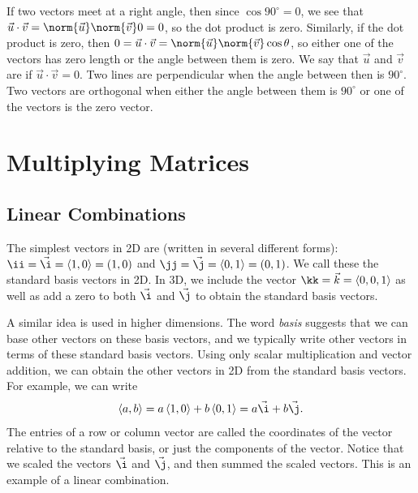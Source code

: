 If two vectors meet at a right angle, then since $\cos 90^\circ = 0$, we see that $\vec u \cdot \vec v = \norm{\vec u}\norm{\vec v}0=0$, so the dot product is zero. 
Similarly, if the dot product is zero, then $0=\vec u \cdot \vec v = \norm{\vec u}\norm{\vec v}\cos \theta$, so either one of the vectors has zero length or the angle between them is zero. 
We say that $\vec u$ and $\vec v$ are  if $\vec u \cdot \vec v=0$. 
Two lines are perpendicular when the angle between then is $90^\circ$. Two vectors are orthogonal when either the angle between them is $90^\circ$ or one of the vectors is the zero vector.

\section{Multiplying Matrices}


\subsection{Linear Combinations}

The simplest vectors in 2D are (written in several different forms): 
$\ii = \vec \i = \left<1,0\right>=(1,0)$ and  
$\jj = \vec \j = \left<0,1\right>=(0,1)$. 
We call these the standard basis vectors in 2D. 
In 3D, we include the vector $\kk = \vec k=\left<0,0,1\right>$ as well as add a zero to both $\vec \i$ and $\vec \j$ to obtain the standard basis vectors. 

A similar idea is used in higher dimensions. 
The word \emph{basis} suggests that we can base other vectors on these basis vectors, and we typically write other vectors in terms of these standard basis vectors. 
Using only scalar multiplication and vector addition, we can obtain the other vectors in 2D from the standard basis vectors. 
For example, we can write $$\left<a,b\right> =a\left<1,0\right>+b\left<0,1\right> = a\vec\i+b\vec \j.$$ 
The entries of a row or column vector are called the coordinates of the vector relative to the standard basis, or just the components of the vector. 
Notice that we scaled the vectors $\vec \i$ and $\vec \j$, and then summed the scaled vectors. 
This is an example of a linear combination.

